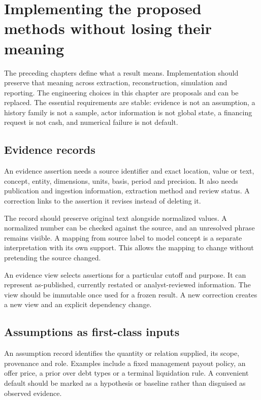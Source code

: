 \chapter[Implementing the proposed methods]{Implementing the proposed methods without losing their meaning}
\label{sim:implementation}

The preceding chapters define what a result means. Implementation should preserve that meaning across extraction, reconstruction, simulation and reporting. The engineering choices in this chapter are proposals and can be replaced. The essential requirements are stable: evidence is not an assumption, a history family is not a sample, actor information is not global state, a financing request is not cash, and numerical failure is not default.

\section{Evidence records}
An evidence assertion needs a source identifier and exact location, value or text, concept, entity, dimensions, units, basis, period and precision. It also needs publication and ingestion information, extraction method and review status. A correction links to the assertion it revises instead of deleting it.

The record should preserve original text alongside normalized values. A normalized number can be checked against the source, and an unresolved phrase remains visible. A mapping from source label to model concept is a separate interpretation with its own support. This allows the mapping to change without pretending the source changed.

An evidence view selects assertions for a particular cutoff and purpose. It can represent as-published, currently restated or analyst-reviewed information. The view should be immutable once used for a frozen result. A new correction creates a new view and an explicit dependency change.

\section{Assumptions as first-class inputs}
An assumption record identifies the quantity or relation supplied, its scope, provenance and role. Examples include a fixed management payout policy, an offer price, a prior over debt types or a terminal liquidation rule. A convenient default should be marked as a hypothesis or baseline rather than disguised as observed evidence.


